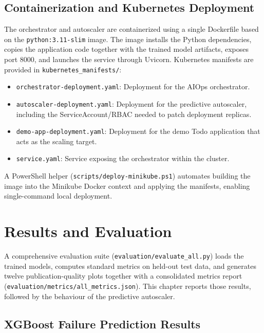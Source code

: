 \documentclass[12pt]{report}
\begin{document}
\section{Containerization and Kubernetes Deployment}

The orchestrator and autoscaler are containerized using a single Dockerfile based on the \texttt{python:3.11-slim} image. The image installs the Python dependencies, copies the application code together with the trained model artifacts, exposes port 8000, and launches the service through Uvicorn. Kubernetes manifests are provided in \texttt{kubernetes\_manifests/}:

\begin{itemize}
    \item \texttt{orchestrator-deployment.yaml}: Deployment for the AIOps orchestrator.
    \item \texttt{autoscaler-deployment.yaml}: Deployment for the predictive autoscaler, including the ServiceAccount/RBAC needed to patch deployment replicas.
    \item \texttt{demo-app-deployment.yaml}: Deployment for the demo Todo application that acts as the scaling target.
    \item \texttt{service.yaml}: Service exposing the orchestrator within the cluster.
\end{itemize}

A PowerShell helper (\texttt{scripts/deploy-minikube.ps1}) automates building the image into the Minikube Docker context and applying the manifests, enabling single-command local deployment.

\clearpage
\chapter{Results and Evaluation}

A comprehensive evaluation suite (\texttt{evaluation/evaluate\_all.py}) loads the trained models, computes standard metrics on held-out test data, and
 generates twelve publication-quality plots together with a consolidated metrics report (\texttt{evaluation/metrics/all\_metrics.json}). This chapter
reports those results, followed by the behaviour of the predictive autoscaler.

\section{XGBoost Failure Prediction Results}
\end{document}
